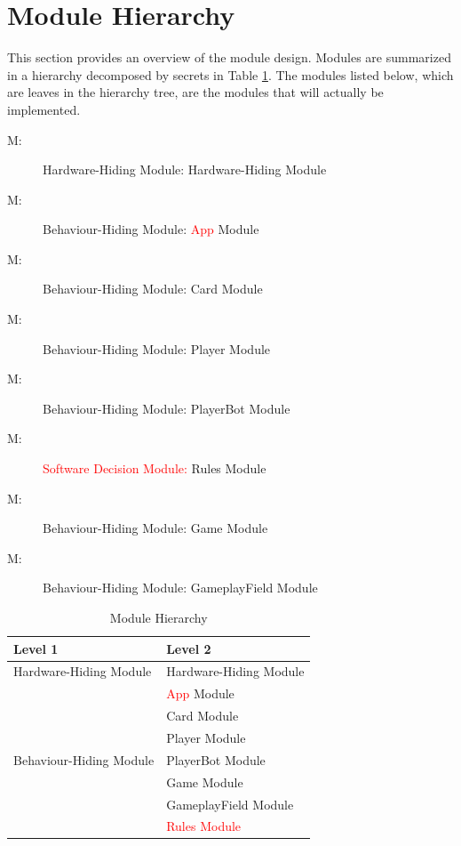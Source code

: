 \documentclass[12pt, titlepage]{article}
\newcounter{mnum}
\newcommand{\mthemnum}{M\themnum}
\begin{document}
\section{Module Hierarchy} \label{SecMH}

This section provides an overview of the module design. Modules are summarized
in a hierarchy decomposed by secrets in Table \ref{TblMH}. The modules listed
below, which are leaves in the hierarchy tree, are the modules that will
actually be implemented.

\begin{description}
\item [ \mthemnum \label{mHH}:] Hardware-Hiding Module: Hardware-Hiding Module
\item [ \mthemnum \label{mHH}:] Behaviour-Hiding Module: \textcolor{red}{App} Module
\item [ \mthemnum \label{mHH}:] Behaviour-Hiding Module:  Card Module
\item [ \mthemnum \label{mHH}:]
Behaviour-Hiding Module:  Player Module
\item [ \mthemnum \label{mHH}:] Behaviour-Hiding Module:  PlayerBot Module
\item [ \mthemnum \label{mHH}:] \textcolor{red}{ Software Decision Module:}  Rules Module
\item [ \mthemnum \label{mHH}:] Behaviour-Hiding Module: Game Module
\item [ \mthemnum \label{mHH}:] Behaviour-Hiding Module:  GameplayField Module

\end{description}


\begin{table}[h!]
\centering
\begin{tabular}{p{} p{}}
\toprule
\textbf{Level 1} & \textbf{Level 2}\\
\midrule

\multirow{1}{0.3\textwidth}{Hardware-Hiding Module} & Hardware-Hiding Module \\
\midrule

\multirow{7}{0.3\textwidth}{Behaviour-Hiding Module} & \textcolor{red}{App} Module\\
& Card Module\\
& Player Module\\
& PlayerBot Module\\
& Game Module\\
& GameplayField Module\\
\midrule

\multirow{1}{0.3\textwidth}{Software Decision Module}
& \textcolor{red}{Rules Module}\\
\bottomrule

\end{tabular}
\caption{Module Hierarchy}
\label{TblMH}
\end{table}
\end{document}
